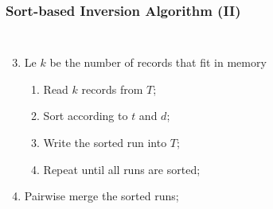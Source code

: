\documentclass[svgnames]{beamer}
\begin{document}
\begin{frame}
    \frametitle{Sort-based Inversion Algorithm (II)}
    
    \begin{columns}

        \begin{enumerate}
            \setcounter{enumi}{2}
        \item Le $k$ be the number of records that fit in memory
            \begin{enumerate}
            \item Read $k$ records from $T$;
            \item Sort according to $t$ and $d$;
            \item Write the sorted run into $T$;
            \item Repeat until all runs are sorted;
            \end{enumerate}
        \item Pairwise merge the sorted runs;
        \end{enumerate}


        \begin{block}{}
            \centering \small


\end{block}
\end{columns}
\end{frame}
\end{document}
